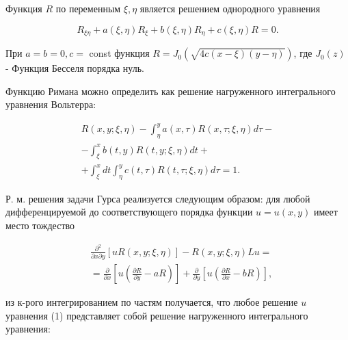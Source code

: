 \documentclass[10pt]{article}
\begin{document}
Функция $R$ по переменным $\xi, \eta$ является решением однородного уравнения



\[

R_{\xi \eta}+a(\xi, \eta) R_{\xi}+b(\xi, \eta) R_{\eta}+c(\xi, \eta) R=0 .

\]



При $a=b=0, c=$ const функция $R=J_{0}(\sqrt{4 c(x-\xi)(y-\eta)})$, где $J_{0}(z)$ - Функция Бесселя порядка нуль.



Функцию Римана можно определить как решение нагруженного интегрального уравнения Вольтерра:



\[

\begin{gathered}

R(x, y ; \xi, \eta)-\int_{\eta}^{y} a(x, \tau) R(x, \tau ; \xi, \eta) d \tau- \\

-\int_{\xi}^{x} b(t, y) R(t, y ; \xi, \eta) d t+ \\

+\int_{\xi}^{x} d t \int_{\eta}^{y} c(t, \tau) R(t, \tau ; \xi, \eta) d \tau=1 .

\end{gathered}

\]



Р. м. решения задачи Гурса реализуется следующим образом: для любой дифференцируемой до соответствующего порядка функции $u=u(x, y)$ имеет место тождество



\[

\begin{aligned}

& \frac{\partial^{2}}{\partial x \partial y}[u R(x, y ; \xi, \eta)]-R(x, y ; \xi, \eta) L u= \\

& =\frac{\partial}{\partial x}\left[u\left(\frac{\partial R}{\partial y}-a R\right)\right]+\frac{\partial}{\partial y}\left[u\left(\frac{\partial R}{\partial x}-b R\right)\right],

\end{aligned}

\]



из к-рого интегрированием по частям получается, что любое решение $u$ уравнения (1) представляет собой решение нагруженного интегрального уравнения:
\end{document}
